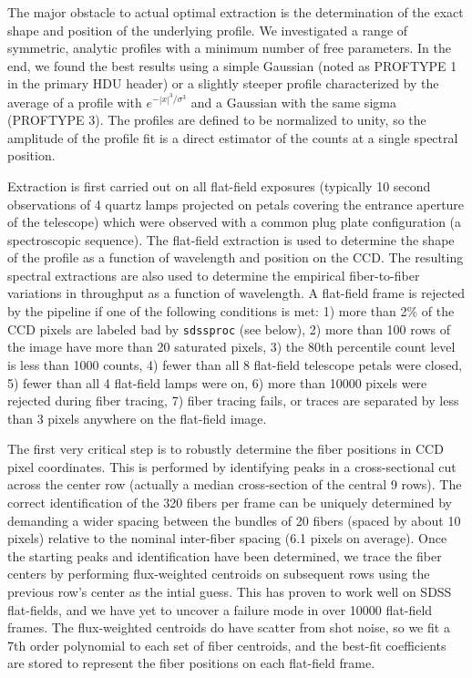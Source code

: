 \documentclass[12pt,preprint]{aastex}
\begin{document}
The major obstacle to actual optimal extraction is the determination of 
the exact shape and position of the underlying profile.  
We investigated a range of symmetric, analytic profiles with a 
minimum number of free parameters.  In the end, we found the best 
results using a simple Gaussian (noted as PROFTYPE 1 in the primary HDU header) 
or a slightly steeper profile characterized by 
the average of a profile with $e^{-|x|^3/\sigma^3}$ and a Gaussian
with the same sigma (PROFTYPE 3).  The profiles are defined to be 
normalized to unity, so the amplitude of the profile fit is a 
direct estimator of the counts at a single spectral position. 

Extraction is first carried out on all flat-field exposures 
(typically 10 second observations of 4 quartz lamps projected on petals covering the entrance aperture of the telescope) which were observed
with a common plug plate configuration (a spectroscopic sequence). 
The flat-field extraction is used to determine the shape of
the profile as a function of wavelength and position on the CCD.  
The resulting spectral extractions are also used to 
determine the empirical fiber-to-fiber variations in throughput 
as a function of wavelength.   
A flat-field frame is rejected by the pipeline if one of the
following conditions is met:  1) more than 2\% of the CCD pixels are labeled
bad by {\tt sdssproc} (see below), 
2) more than 100 rows of the image have more than 20 saturated pixels, 
3) the 80th percentile count level is less than 1000 counts, 
4) fewer than all 8 flat-field telescope petals were closed, 
5) fewer than all 4 flat-field lamps were on,
6) more than 10000 pixels were rejected during fiber tracing, 
7) fiber tracing fails, or traces are separated by less than 3 pixels anywhere
on the flat-field image.

The first very critical step is to robustly determine the fiber positions 
in CCD pixel coordinates.
This is performed by identifying peaks in a cross-sectional cut across 
the center row (actually a median cross-section of the central 9 rows).  
The correct identification of the 320 fibers per frame can be 
uniquely determined by demanding a wider spacing between the bundles 
of 20 fibers (spaced by about 10 pixels) relative to the nominal inter-fiber 
spacing (6.1 pixels on average).  Once the starting peaks and 
identification have been determined, we trace the fiber centers 
by performing flux-weighted centroids on subsequent rows
using the previous row's center as the intial guess.  This has proven to 
work well on SDSS flat-fields, and we have yet to uncover a failure 
mode in over 10000 flat-field frames.
The flux-weighted centroids do have scatter from shot noise, 
so we fit a 7th order polynomial to each set of fiber centroids, 
and the best-fit coefficients are stored to represent the fiber positions 
on each flat-field frame.
\end{document}
